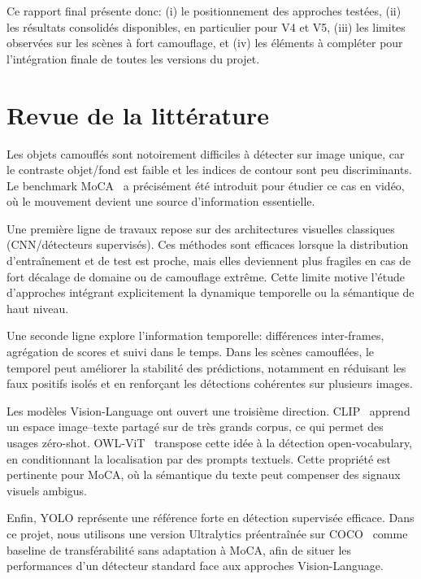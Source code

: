 \documentclass{article}
\begin{document}
Ce rapport final présente donc: (i) le positionnement des approches testées, (ii) les résultats consolidés disponibles, en particulier pour V4 et V5, (iii) les limites observées sur les scènes à fort camouflage, et (iv) les éléments à compléter pour l’intégration finale de toutes les versions du projet.

\section{Revue de la littérature}
Les objets camouflés sont notoirement difficiles à détecter sur image unique, car le contraste objet/fond est faible et les indices de contour sont peu discriminants. Le benchmark MoCA~\cite{li2021moca} a précisément été introduit pour étudier ce cas en vidéo, où le mouvement devient une source d’information essentielle.

Une première ligne de travaux repose sur des architectures visuelles classiques (CNN/détecteurs supervisés). Ces méthodes sont efficaces lorsque la distribution d’entraînement et de test est proche, mais elles deviennent plus fragiles en cas de fort décalage de domaine ou de camouflage extrême. Cette limite motive l’étude d’approches intégrant explicitement la dynamique temporelle ou la sémantique de haut niveau.

Une seconde ligne explore l’information temporelle: différences inter-frames, agrégation de scores et suivi dans le temps. Dans les scènes camouflées, le temporel peut améliorer la stabilité des prédictions, notamment en réduisant les faux positifs isolés et en renforçant les détections cohérentes sur plusieurs images.

Les modèles Vision-Language ont ouvert une troisième direction. CLIP~\cite{radford2021clip} apprend un espace image--texte partagé sur de très grands corpus, ce qui permet des usages zéro-shot. OWL-ViT~\cite{minderer2022owlvit} transpose cette idée à la détection open-vocabulary, en conditionnant la localisation par des prompts textuels. Cette propriété est pertinente pour MoCA, où la sémantique du texte peut compenser des signaux visuels ambigus.

Enfin, YOLO représente une référence forte en détection supervisée efficace. Dans ce projet, nous utilisons une version Ultralytics préentraînée sur COCO~\cite{ultralytics_yolov8,lin2014coco} comme baseline de transférabilité sans adaptation à MoCA, afin de situer les performances d’un détecteur standard face aux approches Vision-Language.
\end{document}
